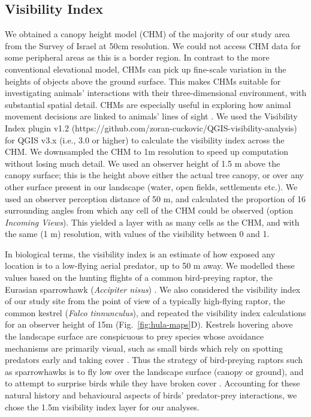 \subsection*{Visibility Index}

We obtained a canopy height model (CHM) of the majority of our study area from the Survey of Israel at 50cm resolution.
We could not access CHM data for some peripheral areas as this is a border region.
In contrast to the more conventional elevational model, CHMs can pick up fine-scale variation in the heights of objects above the ground surface.
This makes CHMs suitable for investigating animals' interactions with their three-dimensional environment, with substantial spatial detail.
CHMs are especially useful in exploring how animal movement decisions are linked to animals' lines of sight \cite{aben2018,aben2021}.
We used the Visibility Index plugin v1.2 (https://github.com/zoran-cuckovic/QGIS-visibility-analysis) for QGIS v3.x (i.e., 3.0 or higher) to calculate the visibility index across the CHM.
We downsampled the CHM to 1m resolution to speed up computation without losing much detail.
We used an observer height of 1.5 m above the canopy surface; this is the height above either the actual tree canopy, or over any other surface present in our landscape (water, open fields, settlements etc.).
We used an observer perception distance of 50 m, and calculated the proportion of 16 surrounding angles from which any cell of the CHM could be observed (option \textit{Incoming Views}).
This yielded a layer with as many cells as the CHM, and with the same (1 m) resolution, with values of the visibility between 0 and 1.

In biological terms, the visibility index is an estimate of how exposed any location is to a low-flying aerial predator, up to 50 m away.
We modelled these values based on the hunting flights of a common bird-preying raptor, the Eurasian sparrowhawk (\textit{Accipiter nisus}) \cite{seress2011,krams2001,krams2020}.
We also considered the visibility index of our study site from the point of view of a typically high-flying raptor, the common kestrel (\textit{Falco tinnunculus}), and repeated the visibility index calculations for an observer height of 15m (Fig.~\ref{fig:hula-maps}D).
Kestrels hovering above the landscape surface are conspicuous to prey species whose avoidance mechanisms are primarily visual, such as small birds which rely on spotting predators early and taking cover \cite{krams2001,krams2020}.
Thus the strategy of bird-preying raptors such as sparrowhawks is to fly low over the landscape surface (canopy or ground), and to attempt to surprise birds while they have broken cover \cite{krams2001,seress2011,krams2020}.
Accounting for these natural history and behavioural aspects of birds' predator-prey interactions, we chose the 1.5m visibility index layer for our analyses.

